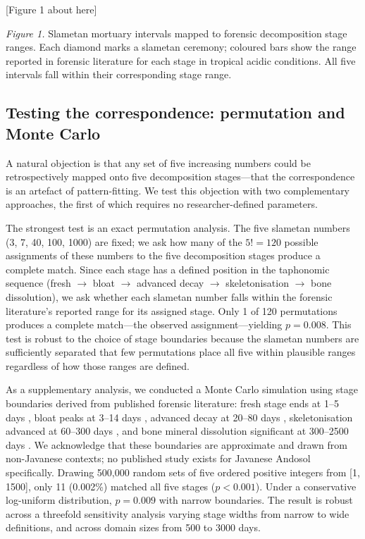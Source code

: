 \documentclass[12pt,a4paper]{article}
\begin{document}
[Figure 1 about here]

\noindent\textit{Figure 1.} Slametan mortuary intervals mapped to forensic decomposition stage ranges. Each diamond marks a slametan ceremony; coloured bars show the range reported in forensic literature for each stage in tropical acidic conditions. All five intervals fall within their corresponding stage range.
\label{fig:mapping}

\subsection{Testing the correspondence: permutation and Monte Carlo}

A natural objection is that any set of five increasing numbers could be retrospectively mapped onto five decomposition stages---that the correspondence is an artefact of pattern-fitting. We test this objection with two complementary approaches, the first of which requires no researcher-defined parameters.

The strongest test is an exact permutation analysis. The five slametan numbers (3, 7, 40, 100, 1000) are fixed; we ask how many of the $5! = 120$ possible assignments of these numbers to the five decomposition stages produce a complete match. Since each stage has a defined position in the taphonomic sequence (fresh $\rightarrow$ bloat $\rightarrow$ advanced decay $\rightarrow$ skeletonisation $\rightarrow$ bone dissolution), we ask whether each slametan number falls within the forensic literature's reported range for its assigned stage. Only 1 of 120 permutations produces a complete match---the observed assignment---yielding $p = 0.008$. This test is robust to the choice of stage boundaries because the slametan numbers are sufficiently separated that few permutations place all five within plausible ranges regardless of how those ranges are defined.

As a supplementary analysis, we conducted a Monte Carlo simulation using stage boundaries derived from published forensic literature: fresh stage ends at 1--5 days \citep{rodriguez_bass_1985, galloway_1997}, bloat peaks at 3--14 days \citep{galloway_1989, vass_2001}, advanced decay at 20--80 days \citep{megyesi_2005}, skeletonisation advanced at 60--300 days \citep{haglund_sorg_1997}, and bone mineral dissolution significant at 300--2500 days \citep{nielsen_marsh_2000, oghenemavwe_2022}. We acknowledge that these boundaries are approximate and drawn from non-Javanese contexts; no published study exists for Javanese Andosol specifically. Drawing 500,000 random sets of five ordered positive integers from [1, 1500], only 11 (0.002\%) matched all five stages ($p < 0.001$). Under a conservative log-uniform distribution, $p = 0.009$ with narrow boundaries. The result is robust across a threefold sensitivity analysis varying stage widths from narrow to wide definitions, and across domain sizes from 500 to 3000 days.
\end{document}
